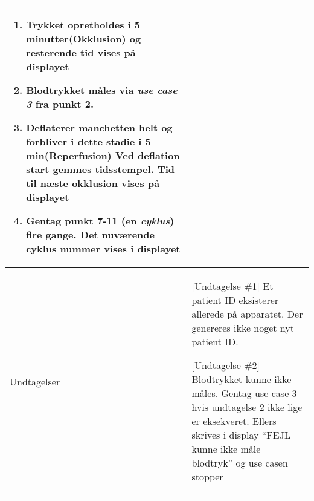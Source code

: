 \begin{center}
\begin{longtable}{ | p{} | p{}| }
\begin{enumerate}
				\item Trykket opretholdes i 5 minutter(Okklusion) og resterende tid vises på displayet
				\item Blodtrykket måles via \textit{use case 3}
				fra punkt 2.
				\item Deflaterer manchetten helt og forbliver i dette stadie i 5 min(Reperfusion) Ved deflation start gemmes tidsstempel. Tid til næste okklusion vises på displayet
				\item Gentag punkt 7-11 (en \textit{cyklus}) fire gange. Det nuværende cyklus nummer vises i displayet
			\end{enumerate} \\ 
			\hline
			Undtagelser & [Undtagelse \#1] Et patient ID eksisterer allerede på apparatet. Der genereres ikke noget nyt patient ID.
			
			[Undtagelse \#2] Blodtrykket kunne ikke måles. Gentag use case 3 hvis undtagelse 2 ikke lige er eksekveret. Ellers skrives i display “FEJL kunne ikke måle blodtryk” og use casen stopper  \\
			\hline
		\end{longtable}
		
	\end{center}
	\pagebreak